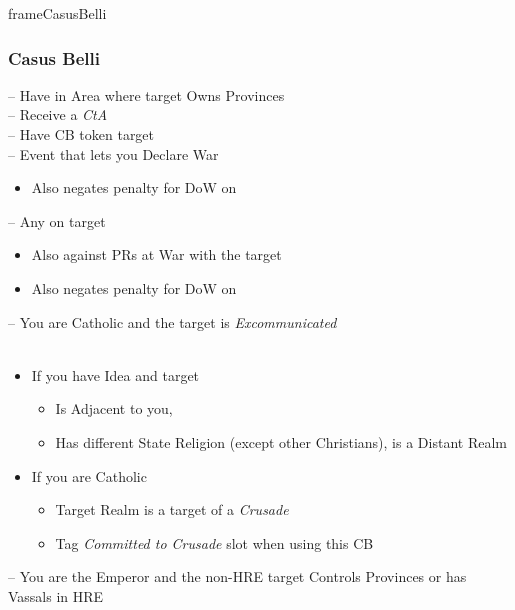 \documentclass[10pt]{article}
\newlength{\fhCasusBelli} \setlength\fhCasusBelli{12\baselineskip}
\begin{document}
\begin{dynamiccontents*}{frameCasusBelli}\begin{eubox}{\fhCasusBelli}
	\begin{multicols}{2}
		\subsubsection*{Casus Belli }
		 -- Have \claim in Area where target Owns Provinces\\
		 -- Receive a \emph{CtA}\\
		 -- Have CB token target\\
		 -- Event that lets you Declare War\\
		\begin{itemize}
			\item {}Also negates penalty for DoW on \marriage
		\end{itemize}
		 -- Any \disputedsuccession on target\\
		\begin{itemize}
			\item Also against PRs at War with the target
			\item {}Also negates penalty for DoW on \marriage
		\end{itemize}
		 -- You are Catholic and the target is \emph{Excommunicated}\\
		\columnbreak
		\\
		\begin{itemize}
			\item If you have  Idea and target
			\begin{itemize}
				\item Is Adjacent to you, 
				\item Has different State Religion (except other Christians),  is a Distant Realm
			\end{itemize}
			\item If you are Catholic
			\begin{itemize}
				\item Target Realm is a target of a \emph{Crusade}
				\item Tag \emph{Committed to Crusade} slot when using this CB
			\end{itemize}
		\end{itemize}
		 -- You are the Emperor and the non-HRE target Controls Provinces or has Vassals in HRE
	\end{multicols}
\end{eubox}\end{dynamiccontents*}
\end{document}
